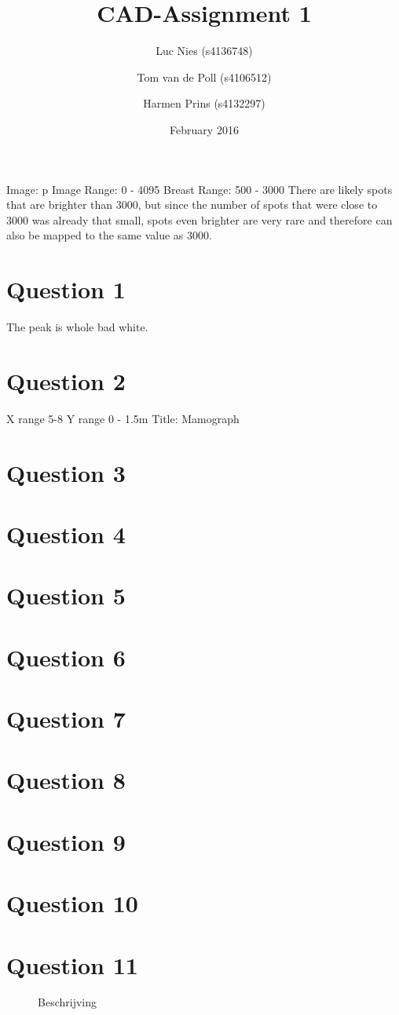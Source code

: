 \documentclass{article}
\title{CAD-Assignment 1}
\author{Luc Nies (s4136748) \and Tom van de Poll (s4106512) \and Harmen Prins (s4132297)}
\date{February 2016}
\begin{document}
\maketitle

Image: p
Image Range: 0 - 4095
Breast Range: 500 - 3000
There are likely spots that are brighter than 3000, but since the number of spots that were close to 3000 was already that small, spots even brighter are very rare and therefore can also be mapped to the same value as 3000.


\section*{Question 1}
The peak is whole bad white.

\section*{Question 2}
X range 5-8
Y range 0 - 1.5m
Title: Mamograph
\section*{Question 3}


\section*{Question 4}
\section*{Question 5}
\section*{Question 6}
\section*{Question 7}
\section*{Question 8}
\section*{Question 9}
\section*{Question 10}
\section*{Question 11}



\begin{figure}[h]
    \centering
    \caption{Beschrijving}
\end{figure}

\begin{lstlisting}
\end{lstlisting}
\end{document}
